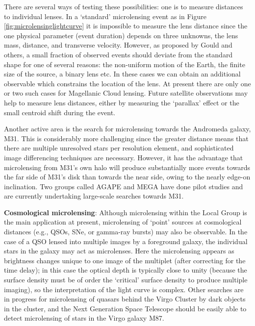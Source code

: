 \documentclass[a4paper,10pt]{article}
\begin{document}
{\noindent}There are several ways of testing these possibilities: one is to measure distances to individual lenses. In a `standard' microlensing event as in Figure \ref{fig:microlensinglightcurve} it is impossible to measure the lens distance since the one physical parameter (event duration) depends on three unknowns, the lens mass, distance, and transverse velocity. However, as proposed by Gould and others, a small fraction of observed events should deviate from the standard shape for one of several reasons: the non-uniform motion of the Earth, the finite size of the source, a binary lens etc. In these cases we can obtain an additional observable which constrains the location of the lens. At present there are only one or two such cases for Magellanic Cloud lensing. Future satellite observations may help to measure lens distances, either by measuring the `parallax' effect or the small centroid shift during the event.

{\noindent}Another active area is the search for microlensing towards the Andromeda galaxy, M31. This is considerably more challenging since the greater distance means that there are multiple unresolved stars per resolution element, and sophisticated image differencing techniques are necessary. However, it has the advantage that microlensing from M31's own halo will produce substantially more events towards the far side of M31's disk than towards the near side, owing to the nearly edge-on inclination. Two groups called AGAPE and MEGA have done pilot studies and are currently undertaking large-scale searches towards M31.

{\noindent}\textbf{Cosmological microlensing}: Although microlensing within the Local Group is the main application at present, microlensing of `point' sources at cosmological distances (e.g., QSOs, SNe, or gamma-ray bursts) may also be observable. In the case of a QSO lensed into multiple images by a foreground galaxy, the individual stars in the galaxy may act as microlenses. Here the microlensing appears as brightness changes unique to one image of the multiplet (after correcting for the time delay); in this case the optical depth is typically close to unity (because the surface density must be of order the `critical' surface density to produce multiple imaging), so the interpretation of the light curve is complex. Other searches are in progress for microlensing of quasars behind the Virgo Cluster by dark objects in the cluster, and the Next Generation Space Telescope should be easily able to detect microlensing of stars in the Virgo galaxy M87.
\end{document}

